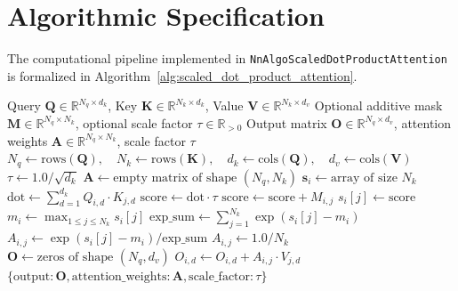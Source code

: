 \documentclass[11pt,a4paper]{article}
\theoremstyle{definition}
\begin{document}
\section{Algorithmic Specification}

The computational pipeline implemented in \texttt{NnAlgoScaledDotProductAttention} is formalized in Algorithm~\ref{alg:scaled_dot_product_attention}.

\begin{algorithm}[H]
\caption{Scaled Dot-Product Attention Forward Execution}
\label{alg:scaled_dot_product_attention}
\begin{algorithmic}[1]
\Require Query $\mathbf{Q} \in \mathbb{R}^{N_q \times d_k}$, Key $\mathbf{K} \in \mathbb{R}^{N_k \times d_k}$, Value $\mathbf{V} \in \mathbb{R}^{N_k \times d_v}$
\Require Optional additive mask $\mathbf{M} \in \mathbb{R}^{N_q \times N_k}$, optional scale factor $\tau \in \mathbb{R}_{> 0}$
\Ensure Output matrix $\mathbf{O} \in \mathbb{R}^{N_q \times d_v}$, attention weights $\mathbf{A} \in \mathbb{R}^{N_q \times N_k}$, scale factor $\tau$
\State $N_q \gets \text{rows}(\mathbf{Q}), \quad N_k \gets \text{rows}(\mathbf{K}), \quad d_k \gets \text{cols}(\mathbf{Q}), \quad d_v \gets \text{cols}(\mathbf{V})$
    \State $\tau \gets 1.0 / \sqrt{d_k}$
\EndIf
\State $\mathbf{A} \gets \text{empty matrix of shape } (N_q, N_k)$
    \State $\mathbf{s}_i \gets \text{array of size } N_k$
        \State $\text{dot} \gets \sum_{d=1}^{d_k} Q_{i, d} \cdot K_{j, d}$
        \State $\text{score} \gets \text{dot} \cdot \tau$
            \State $\text{score} \gets \text{score} + M_{i, j}$
        \EndIf
        \State $s_{i}[j] \gets \text{score}$
    \EndFor
    \State $m_i \gets \max_{1 \le j \le N_k} s_i[j]$
    \State $\text{exp\_sum} \gets \sum_{j=1}^{N_k} \exp(s_i[j] - m_i)$
            \State $A_{i, j} \gets \exp(s_i[j] - m_i) / \text{exp\_sum}$
        \Else
            \State $A_{i, j} \gets 1.0 / N_k$ 
        \EndIf
    \EndFor
\EndFor
\State $\mathbf{O} \gets \text{zeros of shape } (N_q, d_v)$
            \State $O_{i, d} \gets O_{i, d} + A_{i, j} \cdot V_{j, d}$
        \EndFor
    \EndFor
\EndFor
\State \Return $\{\text{output}: \mathbf{O}, \text{attention\_weights}: \mathbf{A}, \text{scale\_factor}: \tau\}$
\end{algorithmic}
\end{algorithm}
\end{document}
